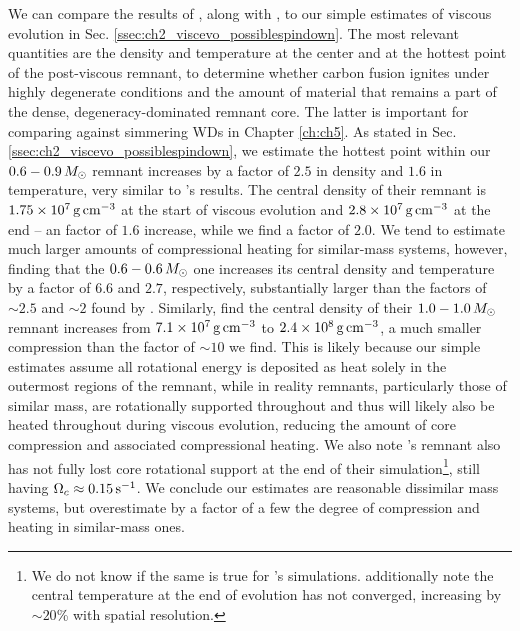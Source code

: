 
We can compare the results of \cite{ji+13}, along with \cite{schw+12}, to our simple estimates of viscous evolution in Sec. \ref{ssec:ch2_viscevo_possiblespindown}.  The most relevant quantities are the density and temperature at the center and at the hottest point of the post-viscous remnant, to determine whether carbon fusion ignites under highly degenerate conditions and the amount of material that remains a part of the dense, degeneracy-dominated remnant core.  The latter is important for comparing against simmering WDs in Chapter \ref{ch:ch5}.  As stated in Sec. \ref{ssec:ch2_viscevo_possiblespindown}, we estimate the hottest point within our $0.6-0.9\,\Msun$ remnant increases by a factor of $2.5$ in density and $1.6$ in temperature, very similar to \cite{schw+12}'s results.  The central density of their remnant is $1.75\times10^7\,\gcc$ at the start of viscous evolution \citep{dan+11} and $2.8\times10^7\,\gcc$ at the end -- an factor of $1.6$ increase, while we find a factor of $2.0$.  We tend to estimate much larger amounts of compressional heating for similar-mass systems, however, finding that the $0.6 - 0.6\,\Msun$ one increases its central density and temperature by a factor of $6.6$ and $2.7$, respectively, substantially larger than the factors of $\sim2.5$ and $\sim2$ found by \cite{ji+13}.  Similarly, \cite{rask+14} find the central density of their $1.0-1.0\,\Msun$ remnant increases from $7.1\times10^7\,\gcc$ to $2.4\times10^8\,\gcc$, a much smaller compression than the factor of $\sim10$ we find.  This is likely because our simple estimates assume all rotational energy is deposited as heat solely in the outermost regions of the remnant, while in reality remnants, particularly those of similar mass, are rotationally supported throughout and thus will likely also be heated throughout during viscous evolution, reducing the amount of core compression and associated compressional heating.  We also note \cite{ji+13}'s remnant also has not fully lost core rotational support at the end of their simulation\footnote{We do not know if the same is true for \cite{rask+14}'s simulations.  \cite{ji+13} additionally note the central temperature at the end of evolution has not converged, increasing by $\sim20$\% with spatial resolution.}, still having $\Omegac \approx 0.15\,\psec$.  We conclude our estimates are reasonable dissimilar mass systems, but overestimate by a factor of a few the degree of compression and heating in similar-mass ones.


